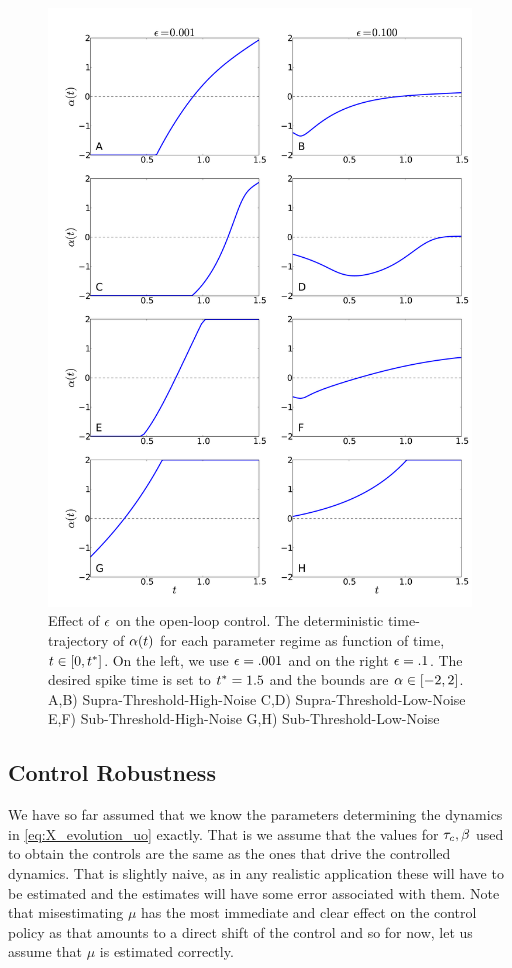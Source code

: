 \documentclass[12pt]{iopart}
\begin{document}
\begin{figure}[htp]
\begin{center}
  \includegraphics[width=.99\textwidth]{Figs/FP_Adjoint/Regimes_eps_comparison.pdf}
  \caption[labelInTOC]{Effect of ${\epsilon}$ on the open-loop control.
  The deterministic time-trajectory of ${\alpha}(t)$ for each
  parameter regime as function of time, $t \in [0, { t^* }]$.
  On the left, we use ${\epsilon} = .001$ and on the right ${\epsilon} = .1$.
  The desired spike time is set to ${ t^* }=1.5$ and the bounds are ${\alpha} \in [-2,2]$.
  A,B) Supra-Threshold-High-Noise C,D) Supra-Threshold-Low-Noise
  E,F) Sub-Threshold-High-Noise G,H) Sub-Threshold-Low-Noise}
  \label{fig:FBK_Regimes_cs_different_es}
\end{center}
\end{figure}



\subsection{Control Robustness}
We have so far assumed that we know the parameters determining the dynamics in
\cref{eq:X_evolution_uo} exactly. That is we assume that the values for ${ \tau_{c} },
{\beta}$ used to obtain the controls are the same as the ones that drive the
controlled dynamics. That is slightly naive, as in any realistic application
these will have to be estimated and the estimates will have some error
associated with them.
Note that misestimating $\mu$ has the most immediate and clear effect on the
control policy as that amounts to a direct shift of the control and so for now,
let us assume that $\mu$ is estimated correctly.
\end{document}
